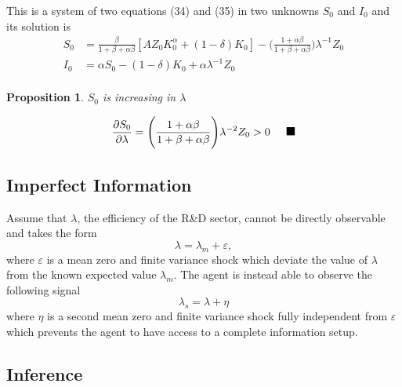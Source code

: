 \documentclass{article}
\newtheorem{prop}{Proposition}
\newenvironment{proof}[1][Proof]{\begin{trivlist}
		\item[\hskip \labelsep {\bfseries #1}]}{\end{trivlist}}
\newcommand{\qed}{\nobreak \ifvmode \relax \else
	\ifdim\lastskip<1.5em \hskip-\lastskip
	\hskip1.5em plus0em minus0.5em \fi \nobreak
	\vrule height0.75em width0.75em depth0em\fi}
\begin{document}
	This is a system of two equations (34) and (35) in two unknowns $S_0$ and $I_0$ and its solution is
	\begin{equation}
	\begin{split}
	S_0 &= \frac{\beta}{1 + \beta+ \alpha \beta}[AZ_0 K_0^{\alpha} + (1-\delta)K_0] - \Bigg( \frac{1 + \alpha \beta}{1 + \beta + \alpha \beta} \Bigg) \lambda^{-1} Z_0 \\
	I_0 &= \alpha S_0 - (1-\delta)K_0 + \alpha \lambda^{-1} Z_0  \\
	\end{split}
	\end{equation}
	\begin{prop}
		$S_0$ is increasing in $\lambda$
	\end{prop}
	\begin{proof}
		\begin{equation}
		\frac{\partial S_0}{\partial \lambda} = \Bigg( \frac{1 + \alpha \beta}{1 + \beta + \alpha \beta} \Bigg) \lambda^{-2} Z_0 > 0   \qed
		\end{equation}
	\end{proof}
	
	\subsection*{Imperfect Information}
	
	Assume that $\lambda$, the efficiency of the R\&D sector, cannot be directly observable and takes the form
	\begin{equation}
	\lambda = \lambda_m + \varepsilon,
	\end{equation}
	where $\varepsilon$ is a mean zero and finite variance shock which deviate the value of $\lambda$ from the known expected value $\lambda_m$. The agent is instead able to observe the following signal
	\begin{equation}
	\lambda_s = \lambda + \eta
	\end{equation}
	where $\eta$ is a second mean zero and finite variance shock fully independent from $\varepsilon$ which prevents the agent to have access to a complete information setup.
	
	\subsection*{Inference}
	
\end{document}
